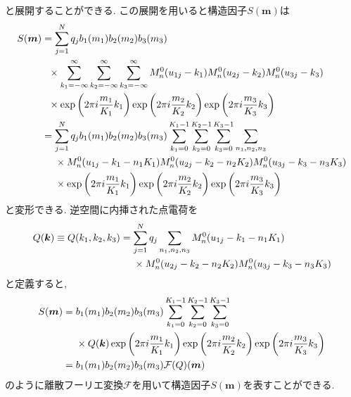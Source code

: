 と展開することができる. この展開を用いると構造因子$S(\bm{m})$は
\begin{align}
    S(\bm{m})
 &=
    \sum_{j=1}^{N} q_{j} b_{1}(m_{1}) b_{2}(m_{2}) b_{3}(m_{3})
 \notag
 \\
 &~~ \times
    \sum_{k_{1}=-\infty}^{\infty} \sum_{k_{2}=-\infty}^{\infty} \sum_{k_{3}=-\infty}^{\infty}
    M_{n}^{0}(u_{1j}- k_{1}) M_{n}^{0}(u_{2j} - k_{2}) M_{n}^{0}(u_{3j} - k_{3})
 \notag
 \\
 &~~ \times
    \exp\left( 2 \pi i \frac{m_{1}}{K_{1}} k_{1} \right)
    \exp\left( 2 \pi i \frac{m_{2}}{K_{2}} k_{2} \right)
    \exp\left( 2 \pi i \frac{m_{3}}{K_{3}} k_{3} \right)
 \notag
 \\
 &=
    \sum_{j=1}^{N} q_{j} b_{1}(m_{1}) b_{2}(m_{2}) b_{3}(m_{3})
    \sum_{k_{1}=0}^{K_{1}-1} \sum_{k_{2}=0}^{K_{2}-1} \sum_{k_{3}=0}^{K_{3}-1} \sum_{n_{1},n_{2},n_{3}}
 \notag
 \\
 &~~~~ \times
    M_{n}^{0}(u_{1j} - k_{1} - n_{1}K_{1})
    M_{n}^{0}(u_{2j} - k_{2} - n_{2}K_{2})
    M_{n}^{0}(u_{3j} - k_{3} - n_{3}K_{3})
 \notag
 \\
 &~~~~ \times
    \exp\left( 2 \pi i \frac{m_{1}}{K_{1}} k_{1} \right)
    \exp\left( 2 \pi i \frac{m_{2}}{K_{2}} k_{2} \right)
    \exp\left( 2 \pi i \frac{m_{3}}{K_{3}} k_{3} \right)
 \label{eq:PME17}
\end{align}
と変形できる. 逆空間に内挿された点電荷を
\begin{align}
    Q(\bm{k})
 \equiv
    Q(k_{1}, k_{2}, k_{3})
 &=
    \sum_{j=1}^{N} q_{j} \sum_{n_{1}, n_{2}, n_{3}}
    M_{n}^{0}(u_{1j}- k_{1} - n_{1}K_{1})
 \notag
 \\ &~~~~ \times
    M_{n}^{0}(u_{2j} - k_{2} - n_{2}K_{2}) M_{n}^{0}(u_{3j} - k_{3} - n_{3}K_{3})
 \label{eq:PME18}
 \end{align}
と定義すると,
\begin{align}
    S(\bm{m})
 &=
    b_{1}(m_{1}) b_{2}(m_{2}) b_{3}(m_{3})
    \sum_{k_{1}=0}^{K_{1}-1}  \sum_{k_{2}=0}^{K_{2}-1}  \sum_{k_{3}=0}^{K_{3}-1}
 \notag
 \\
 &~~~~ \times
    Q(\bm{k})
    \exp\left( 2 \pi i \frac{m_{1}}{K_{1}} k_{1} \right)
    \exp\left( 2 \pi i \frac{m_{2}}{K_{2}} k_{2} \right)
    \exp\left( 2 \pi i \frac{m_{3}}{K_{3}} k_{3} \right)
 \notag
 \\
 &=
    b_{1}(m_{1}) b_{2}(m_{2}) b_{3}(m_{3})
    \mathcal{F}(Q) (\bm{m})
 \label{eq:PME19}
\end{align}
のように離散フーリエ変換$\mathcal{F}$を用いて構造因子$S(\bm{m})$を表すことができる.
